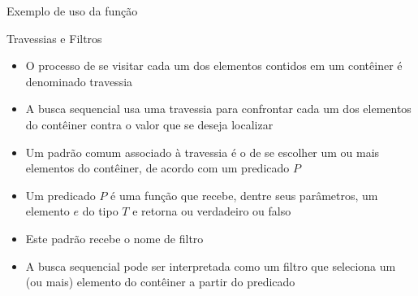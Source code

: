\begin{frame}[fragile]{Exemplo de uso da função }
\end{frame}

\begin{frame}[fragile]{Travessias e Filtros}

    \begin{itemize}
        \item O processo de se visitar cada um dos elementos contidos em um contêiner é
            denominado travessia

        \item A busca sequencial usa uma travessia para confrontar cada um dos elementos 
            do contêiner contra o valor que se deseja localizar

        \item Um padrão comum associado à travessia é o de se escolher um ou mais elementos do
            contêiner, de acordo com um predicado $P$

        \item Um predicado $P$ é uma função que recebe, dentre seus parâmetros, um elemento $e$ do 
        tipo $T$ e retorna ou verdadeiro ou falso

        \item Este padrão recebe o nome de filtro

        \item A busca sequencial pode ser interpretada como um filtro que seleciona um (ou mais) 
            elemento do contêiner a partir do predicado


    \end{itemize}

\end{frame}

